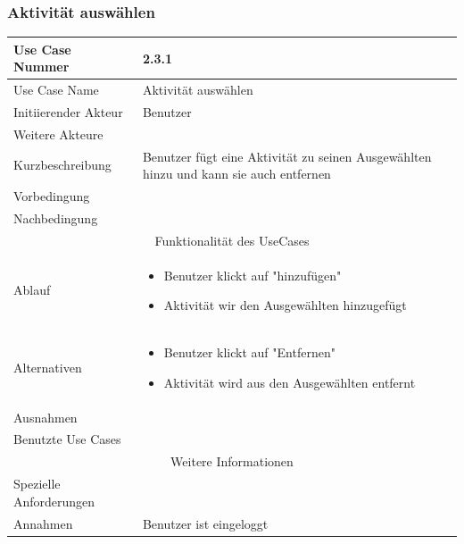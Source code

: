 \documentclass[10pt,a4paper]{article}
\begin{document}
\subsubsection{Aktivit\"at ausw\"ahlen}
		\begin{tabular}{|l|p{.5\linewidth}|}
		\hline Use Case Nummer & 2.3.1 \\ 
		\hline Use Case Name & Aktivit\"at ausw\"ahlen \\ 
		\hline Initiierender Akteur & Benutzer \\
		\hline Weitere Akteure &  \\
		\hline Kurzbeschreibung & Benutzer f\"ugt eine Aktivit\"at zu seinen Ausgew\"ahlten hinzu und kann sie auch entfernen \\
		\hline Vorbedingung &  \\
		\hline Nachbedingung &  \\
		\hline \multicolumn{2}{|c|}{Funktionalität des UseCases}\\
		\hline Ablauf & \begin{itemize}
			\item Benutzer klickt auf "hinzuf\"ugen"
			\item Aktivit\"at wir den Ausgew\"ahlten hinzugef\"ugt
		\end{itemize} \\
		\hline Alternativen & \begin{itemize}
			\item Benutzer klickt auf "Entfernen"
			\item Aktivit\"at wird aus den Ausgew\"ahlten entfernt
		\end{itemize}  \\
		\hline Ausnahmen &  \\
		\hline Benutzte Use Cases &  \\
		\hline \multicolumn{2}{|c|}{Weitere Informationen} \\
		\hline Spezielle Anforderungen &  \\
		\hline Annahmen & Benutzer ist eingeloggt \\
		\hline
		\end{tabular}
\end{document}
